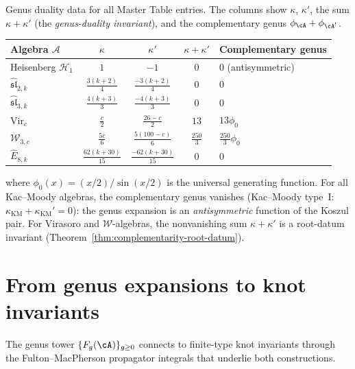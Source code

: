 \begin{computation}\label{comp:genus-duality-table}
Genus duality data for all Master Table entries.
The columns show $\kappa$, $\kappa'$, the sum $\kappa + \kappa'$
(the \emph{genus-duality invariant}), and the complementary genus
$\phi_{\cA} + \phi_{\cA^!}$.
\begin{center}
\renewcommand{\arraystretch}{1.2}
\begin{tabular}{lcccl}
\toprule
Algebra $\mathcal{A}$ & $\kappa$ & $\kappa'$ & $\kappa + \kappa'$ & Complementary genus \\
\midrule
Heisenberg $\mathcal{H}_1$ & $1$ & $-1$ & $0$ & $0$ (antisymmetric) \\
$\widehat{\mathfrak{sl}}_{2,k}$ & $\frac{3(k+2)}{4}$ & $\frac{-3(k+2)}{4}$ & $0$ & $0$ \\
$\widehat{\mathfrak{sl}}_{3,k}$ & $\frac{4(k+3)}{3}$ & $\frac{-4(k+3)}{3}$ & $0$ & $0$ \\
$\mathrm{Vir}_c$ & $\frac{c}{2}$ & $\frac{26-c}{2}$ & $13$ & $13\phi_0$ \\
$\mathcal{W}_{3,c}$ & $\frac{5c}{6}$ & $\frac{5(100-c)}{6}$ & $\frac{250}{3}$ & $\frac{250}{3}\phi_0$ \\
$\widehat{E}_{8,k}$ & $\frac{62(k+30)}{15}$ & $\frac{-62(k+30)}{15}$ & $0$ & $0$ \\
\bottomrule
\end{tabular}
\end{center}
where $\phi_0(x) = (x/2)/\sin(x/2)$ is the universal generating function.
For all Kac--Moody algebras, the complementary genus vanishes
(Kac--Moody type~I: $\kappa_{\mathrm{KM}} + \kappa_{\mathrm{KM}}' = 0$): the genus expansion is an
\emph{antisymmetric} function of the Koszul pair. For Virasoro and
$\mathcal{W}$-algebras, the nonvanishing sum $\kappa + \kappa'$ is
a root-datum invariant
\textup{(}Theorem~\textup{\ref{thm:complementarity-root-datum})}.
\end{computation}


\section{From genus expansions to knot invariants}
\label{sec:genus-knot-invariants}

The genus tower $\{F_g(\cA)\}_{g \geq 0}$ connects to finite-type
knot invariants through the Fulton--MacPherson propagator integrals
that underlie both constructions.

